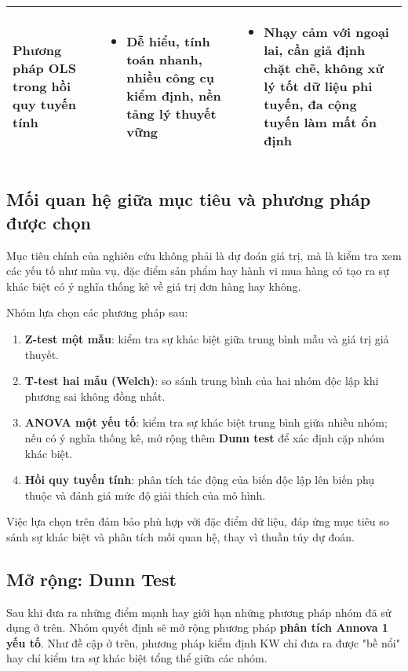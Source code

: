 \begin{table}[H]
\begin{tabular}{|p{3.2cm}|p{5.5cm}|p{5.5cm}|}
\textbf{Phương pháp OLS trong hồi quy tuyến tính} &
\begin{itemize}[leftmargin=*, topsep=0pt, partopsep=0pt, parsep=0pt, itemsep=0pt]
    \item Dễ hiểu, tính toán nhanh, nhiều công cụ kiểm định, nền tảng lý thuyết vững
\end{itemize} &
\begin{itemize}[leftmargin=*, topsep=0pt, partopsep =0pt, parsep=0pt, itemsep=0pt]
    \item Nhạy cảm với ngoại lai, cần giả định chặt chẽ, không xử lý tốt dữ liệu phi tuyến, đa cộng tuyến làm mất ổn định
\end{itemize} \\ \hline 

\end{tabular}
\end{table}

\subsection{Mối quan hệ giữa mục tiêu và phương pháp được chọn}

Mục tiêu chính của nghiên cứu không phải là dự đoán giá trị, mà là kiểm tra xem các yếu tố như mùa vụ, đặc điểm sản phẩm hay hành vi mua hàng có tạo ra sự khác biệt có ý nghĩa thống kê về giá trị đơn hàng hay không. 

Nhóm lựa chọn các phương pháp sau:
\begin{enumerate}
    \item \textbf{Z-test một mẫu}: kiểm tra sự khác biệt giữa trung bình mẫu và giá trị giả thuyết.
    \item \textbf{T-test hai mẫu (Welch)}: so sánh trung bình của hai nhóm độc lập khi phương sai không đồng nhất.
    \item \textbf{ANOVA một yếu tố}: kiểm tra sự khác biệt trung bình giữa nhiều nhóm; nếu có ý nghĩa thống kê, mở rộng thêm \textbf{Dunn test} để xác định cặp nhóm khác biệt.
    \item \textbf{Hồi quy tuyến tính}: phân tích tác động của biến độc lập lên biến phụ thuộc và đánh giá mức độ giải thích của mô hình.
\end{enumerate}

Việc lựa chọn trên đảm bảo phù hợp với đặc điểm dữ liệu, đáp ứng mục tiêu so sánh sự khác biệt và phân tích mối quan hệ, thay vì thuần túy dự đoán.

\subsection{Mở rộng: Dunn Test}
Sau khi đưa ra những điểm mạnh hay giới hạn những phương pháp nhóm đã sử dụng ở trên. Nhóm quyết định sẽ mở rộng phương pháp \textbf{phân tích Annova 1 yếu tố}.
Như đề cập ở trên, phương pháp kiểm định KW chỉ đưa ra được "bề nổi" hay chỉ kiểm tra sự khác biệt tổng thể giữa các nhóm.

